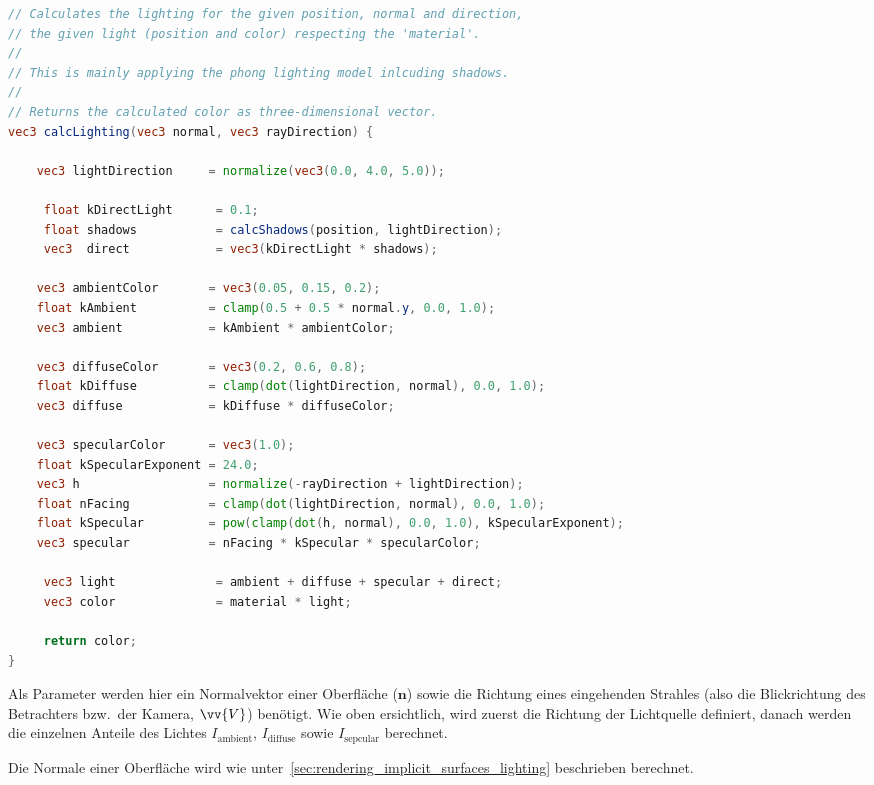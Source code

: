 \begin{lstlisting}[language=GLSL,caption={Umsetzung des
        Phong-Beleuchtungsmodelles in
        GLSL.},label={alg:glsl_lighting},captionpos=b,emph={calcLighting}]
// Calculates the lighting for the given position, normal and direction,
// the given light (position and color) respecting the 'material'.
//
// This is mainly applying the phong lighting model inlcuding shadows.
//
// Returns the calculated color as three-dimensional vector.
vec3 calcLighting(vec3 normal, vec3 rayDirection) {

    vec3 lightDirection     = normalize(vec3(0.0, 4.0, 5.0));

     float kDirectLight      = 0.1;
     float shadows           = calcShadows(position, lightDirection);
     vec3  direct            = vec3(kDirectLight * shadows);

    vec3 ambientColor       = vec3(0.05, 0.15, 0.2);
    float kAmbient          = clamp(0.5 + 0.5 * normal.y, 0.0, 1.0);
    vec3 ambient            = kAmbient * ambientColor;

    vec3 diffuseColor       = vec3(0.2, 0.6, 0.8);
    float kDiffuse          = clamp(dot(lightDirection, normal), 0.0, 1.0);
    vec3 diffuse            = kDiffuse * diffuseColor;

    vec3 specularColor      = vec3(1.0);
    float kSpecularExponent = 24.0;
    vec3 h                  = normalize(-rayDirection + lightDirection);
    float nFacing           = clamp(dot(lightDirection, normal), 0.0, 1.0);
    float kSpecular         = pow(clamp(dot(h, normal), 0.0, 1.0), kSpecularExponent);
    vec3 specular           = nFacing * kSpecular * specularColor;

     vec3 light              = ambient + diffuse + specular + direct;
     vec3 color              = material * light;
 
     return color;
}
\end{lstlisting}

Als Parameter werden hier ein Normalvektor einer Oberfläche ($\bm{n}$)
sowie die Richtung eines eingehenden Strahles (also die Blickrichtung
des Betrachters bzw.\ der Kamera, $\vv{V}$) benötigt.
Wie oben ersichtlich, wird zuerst die Richtung der Lichtquelle definiert,
danach werden die einzelnen Anteile des Lichtes $I_{\text{ambient}}$,
$I_{\text{diffuse}}$ sowie $I_{\text{sepcular}}$ berechnet.

Die Normale einer Oberfläche wird wie
unter~\autoref{sec:rendering_implicit_surfaces_lighting} beschrieben
berechnet.

